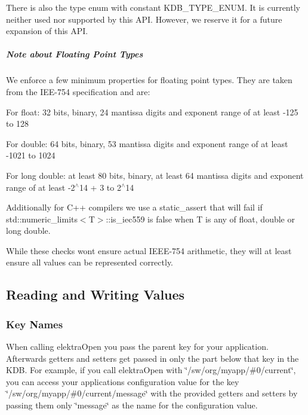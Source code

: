 There is also the type {\ttfamily enum} with constant {\ttfamily K\+D\+B\+\_\+\+T\+Y\+P\+E\+\_\+\+E\+N\+UM}. It is currently neither used nor supported by this A\+PI. However, we reserve it for a future expansion of this A\+PI.

\subparagraph*{Note about Floating Point Types}

We enforce a few minimum properties for floating point types. They are taken from the I\+E\+E-\/754 specification and are\+:


\begin{DoxyItemize}
\item For {\ttfamily float}\+: 32 bits, binary, 24 mantissa digits and exponent range of at least -\/125 to 128
\item For {\ttfamily double}\+: 64 bits, binary, 53 mantissa digits and exponent range of at least -\/1021 to 1024
\item For {\ttfamily long double}\+: at least 80 bits, binary, at least 64 mantissa digits and exponent range of at least -\/2$^\wedge$14 + 3 to 2$^\wedge$14
\end{DoxyItemize}

Additionally for C++ compilers we use a {\ttfamily static\+\_\+assert} that will fail if {\ttfamily std\+::numeric\+\_\+limits$<$T$>$\+::is\+\_\+iec559} is {\ttfamily false} when {\ttfamily T} is any of {\ttfamily float}, {\ttfamily double} or {\ttfamily long double}.

While these checks won\textquotesingle{}t ensure actual I\+E\+E\+E-\/754 arithmetic, they will at least ensure all values can be represented correctly.

\label{_reading-and-writing-values}%


\subsection*{Reading and Writing Values}

\subsubsection*{Key Names}

When calling {\ttfamily elektra\+Open} you pass the parent key for your application. Afterwards getters and setters get passed in only the part below that key in the K\+DB. For example, if you call {\ttfamily elektra\+Open} with {\ttfamily \char`\"{}/sw/org/myapp/\#0/current\char`\"{}}, you can access your applications configuration value for the key {\ttfamily \char`\"{}/sw/org/myapp/\#0/current/message\char`\"{}} with the provided getters and setters by passing them only {\ttfamily \char`\"{}message\char`\"{}} as the name for the configuration value.

